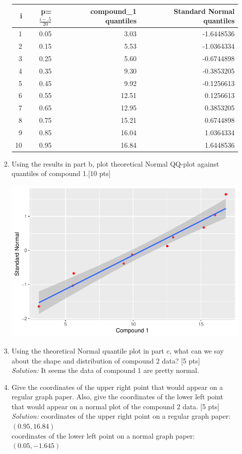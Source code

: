 \documentclass[11pt]{article}\usepackage[]{graphicx}\usepackage[]{color}
\begin{document}
\begin{enumerate}
\begin{enumerate}
\begin{center}
\begin{tabular}{r|r|r|r}
\hline
i & p=$\frac{i-.5}{20}$ & compound_1 quantiles & Standard Normal quantiles\\
\hline
1 & 0.05 & 3.03 & -1.6448536\\
\hline
2 & 0.15 & 5.53 & -1.0364334\\
\hline
3 & 0.25 & 5.60 & -0.6744898\\
\hline
4 & 0.35 & 9.30 & -0.3853205\\
\hline
5 & 0.45 & 9.92 & -0.1256613\\
\hline
6 & 0.55 & 12.51 & 0.1256613\\
\hline
7 & 0.65 & 12.95 & 0.3853205\\
\hline
8 & 0.75 & 15.21 & 0.6744898\\
\hline
9 & 0.85 & 16.04 & 1.0364334\\
\hline
10 & 0.95 & 16.84 & 1.6448536\\
\hline
\end{tabular}
\end{center}

    \item Using the results in part b, plot theoretical Normal QQ-plot against quantiles of compound 1.[10 pts]
    
    
\includegraphics{stat305-hw3_s20_sol-003}
    
    \item Using the theoretical Normal quantile plot in part c, what can we say about the shape and distribution of compound 2 data? [5 pts]\\
   \emph{Solution:} It seems the data of compound 1 are pretty normal.
    \item Give the coordinates  of the upper right point that would appear on a regular graph paper. Also, give the coordinates of the lower left point that would appear on a normal plot of the compound 2 data. [5 pts]\\
    \emph{Solution:} coordinates  of the upper right point on a regular graph paper: $(0.95, 16.84)$\\
    coordinates  of the lower left point on a normal graph paper: $(0.05, -1.645)$
\end{enumerate}    



\end{enumerate}
\end{document}
